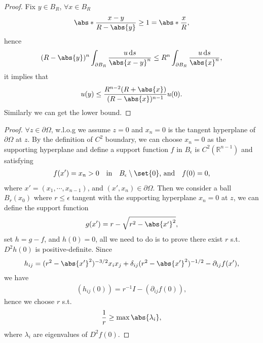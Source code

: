 \documentclass[a4paper]{article}
\newcommand\diff{\,\mathrm{d}}
\DeclarePairedDelimiter{\set}\lbrace\rbrace
\DeclarePairedDelimiter{\abs}\lvert\rvert
\def\R{\mathbb{R}}
\begin{document}
\begin{proof}
Fix $y \in B_R$, $\forall x \in B_R$
\begin{align*}
\abs*{\frac{x-y}{R-\abs{y}}} \geq 1 = \abs*{\frac{x}{R}},
\end{align*}
hence
\begin{align*}
(R-\abs{y})^n\int_{\partial B_R} \frac{u\diff s}{\abs{x-y}^n} \leq R^n \int_{\partial B_R} \frac{u\diff s}{\abs{x}^n},
\end{align*}
it implies that
\begin{align*}
u(y) \leq \frac{R^{n-2}(R+\abs{x})}{(R-\abs{x})^{n-1}}u(0).
\end{align*}
Similarly we can get the lower bound.
\end{proof}
\begin{proof}
$\forall z \in \partial\Omega$, w.l.o.g we assume $z = 0$ and $x_n = 0$ is the tangent hyperplane of $\partial\Omega$ at $z$.
By the definition of $C^2$ boundary, we can choose $x_n = 0$ as the supporting hyperplane and define a support function $f$
in $B_{\epsilon}$ is $C^2(\R^{n-1})$ and satisfying
\begin{align*}
f(x') = x_n > 0 \quad \text{in} \quad B_{\epsilon}\setminus\set{0} \text{, and} \quad f(0)=0,
\end{align*}
where $x' = (x_1, \cdots, x_{n-1})$, and $(x',x_n) \in \partial\Omega$.
Then we consider a ball $B_r(x_0)$ where $r \leq \epsilon$
tangent with the supporting hyperplane $x_n = 0$ at $z$, we can define the support function
\begin{align*}
g(x') = r - \sqrt{r^2 - \abs{x'}^2},
\end{align*}
set $h=g-f$, and $h(0) = 0$, all we need to do is to prove there exist $r$ s.t. $D^2h(0)$ is positive-definite. Since
\begin{align*}
h_{ij} = (r^2 - \abs{x'}^2)^{-3/2}x_ix_j + \delta_{ij}(r^2 - \abs{x'}^2)^{-1/2} - \partial_{ij}f(x'),
\end{align*}
we have
\begin{align*}
\left(h_{ij}(0)\right) = r^{-1}I - (\partial_{ij}f(0)),
\end{align*}
hence we choose $r$ s.t.
\begin{align*}
\frac{1}{r} \geq \max{\abs{\lambda_i}},
\end{align*}
where $\lambda_i$ are eigenvalues of $D^2f(0)$.
\end{proof}
\setcounter{section}{3}
\end{document}
